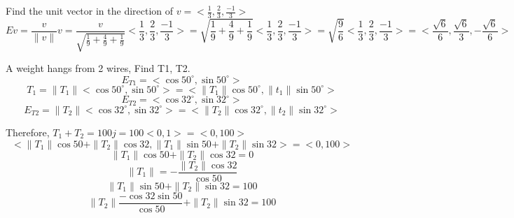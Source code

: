\documentclass[]{article}
\title{\docTitle}
\author{\docAuthor}
\date{\today}
\begin{document}
\maketitle

Find the unit vector in the direction of $v = <\frac{1}{3},\frac{2}{3},\frac{-1}{3}>$
\begin{equation*}
    Ev = \frac{v}{\lVert v\rVert}v = \frac{v}{\sqrt{\frac{1}{9}+\frac{4}{9}+\frac{1}{9}}}<\frac{1}{3},\frac{2}{3},\frac{-1}{3}> = \sqrt{\frac{1}{9}+\frac{4}{9}+\frac{1}{9}}<\frac{1}{3},\frac{2}{3},\frac{-1}{3}> = \sqrt{\frac{9}{6}}<\frac{1}{3},\frac{2}{3},\frac{-1}{3}> = <\frac{\sqrt{6}}{6},\frac{\sqrt{6}}{3},-\frac{\sqrt{6}}{6}>
\end{equation*}

A weight hangs from 2 wires, Find T1, T2.
\begin{equation*}
    E_{T1} = <\cos 50^{\circ}, \sin 50^{\circ}>
\end{equation*}
\begin{equation*}
    T_1 = \|T_1\|<\cos 50^{\circ}, \sin 50^{\circ}> = <\|T_1\|\cos 50^{\circ}, \|t_1\|\sin 50^{\circ}>
\end{equation*}
\begin{equation*}
    E_{T2} = <\cos 32^{\circ}, \sin 32^{\circ}>
\end{equation*}
\begin{equation*}
    E_{T2} = \|T_2\|<\cos 32^{\circ}, \sin 32^{\circ}> = <\|T_2\|\cos 32^{\circ}, \|t_2\|\sin 32^{\circ}>
\end{equation*}

Therefore, $T_1 + T_2 = 100j = 100<0,1> = <0, 100>$\\
\begin{equation*}
    <\|T_1\|\cos 50 + \|T_2\|\cos 32, \|T_1\|\sin 50 + \|T_2\|\sin 32> = <0, 100>
\end{equation*}
\begin{equation*}
    \|T_1\|\cos 50 + \|T_2\|\cos 32 = 0
\end{equation*}
\begin{equation*}
    \|T_1\| = -\frac{\|T_2\|\cos 32}{\cos 50}
\end{equation*}
\begin{equation*}
\|T_1\|\sin 50 + \|T_2\|\sin 32 = 100
\end{equation*}
\begin{equation*}
    \|T_2\|\frac{-\cos 32\sin 50}{\cos 50} + \|T_2\|\sin 32 = 100
\end{equation*}
\end{document}
